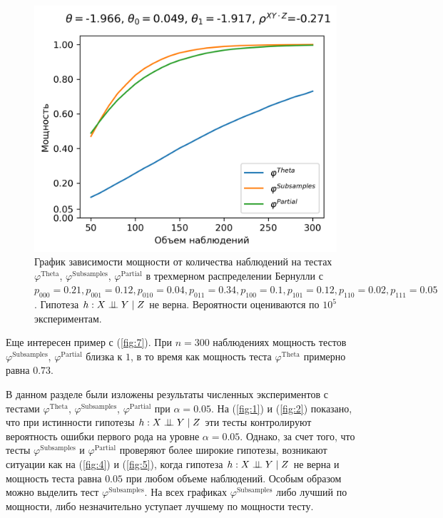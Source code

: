 \begin{figure}[H]
    \centering
    \includegraphics[scale=0.6]{images/graph7.png}
    \caption{График зависимости мощности от количества наблюдений
    на тестах $\varphi^{\text{Theta}}$, $\varphi^{\text{Subsamples}}$, $\varphi^{\text{Partial}}$
    в трехмерном распределении Бернулли с $p_{000}=0.21, p_{001}=0.12, 
    p_{010}=0.04, p_{011}=0.34,
    p_{100}=0.1, p_{101}=0.12, p_{110}=0.02, p_{111}=0.05$. 
    Гипотеза $h: X \perp\!\!\!\perp Y \mid Z$ не верна.
    Вероятности оцениваются по $10^5$ экспериментам.} \label{fig:7}
\end{figure}

Еще интересен пример с (\autoref{fig:7}). 
При $n=300$ наблюдениях мощность тестов
$\varphi^{\text{Subsamples}}$, $\varphi^{\text{Partial}}$ близка к $1$,
в то время как мощность теста $\varphi^{\text{Theta}}$ примерно равна $0.73$.

В данном разделе были изложены результаты численных экспериментов с тестами
$\varphi^{\text{Theta}}$, $\varphi^{\text{Subsamples}}$, 
$\varphi^{\text{Partial}}$ при $\alpha=0.05$. На 
(\autoref{fig:1}) и (\autoref{fig:2}) показано, что 
при истинности гипотезы  
$h: X \perp\!\!\!\perp Y \mid Z$ эти тесты контролируют вероятность ошибки первого рода
на уровне $\alpha=0.05$. 
Однако, за счет того, что тесты 
$\varphi^{\text{Subsamples}}$ и
$\varphi^{\text{Partial}}$ проверяют более широкие гипотезы,
возникают ситуации как на 
 (\autoref{fig:4}) и (\autoref{fig:5}), когда гипотеза $h: X \perp\!\!\!\perp Y \mid Z$
не верна и мощность теста равна $0.05$ при любом объеме наблюдений.
Особым образом можно выделить тест $\varphi^{\text{Subsamples}}$.
На всех графиках $\varphi^{\text{Subsamples}}$ либо лучший по мощности,
либо незначительно уступает лучшему по мощности тесту.
